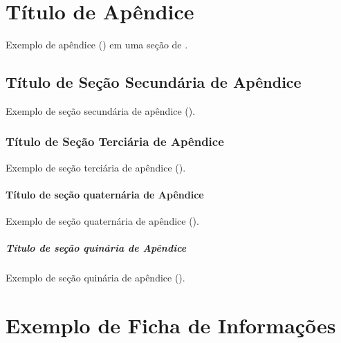 \begin{Appendix}

\section{Título de Apêndice}%
\label{sect:apx-a1}

Exemplo de apêndice () em uma seção de .

\subsection{Título de Seção Secundária de Apêndice}%
\label{ssect:apx-a2}

Exemplo de seção secundária de apêndice ().

\subsubsection{Título de Seção Terciária de Apêndice}%
\label{sssect:apx-a3}

Exemplo de seção terciária de apêndice ().

\paragraph{Título de seção quaternária de Apêndice}%
\label{prgh:apx-a4}

Exemplo de seção quaternária de apêndice ().

\subparagraph{Título de seção quinária de Apêndice}%
\label{sprgh:apx-a5}

Exemplo de seção quinária de apêndice ().

\section{Exemplo de Ficha de Informações}%
\label{sect:apx-info-card}


\end{Appendix}
